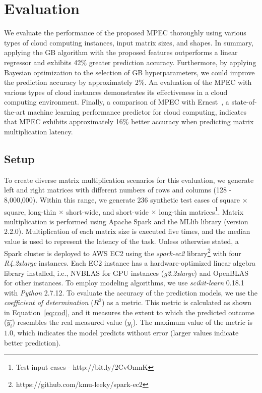 \documentclass[10pt, conference, compsocconf]{IEEEtran}
\begin{document}
\section{Evaluation}{\label{sec:eval}}
We evaluate the performance of the proposed MPEC thoroughly using various types of cloud computing instances, input matrix sizes, and shapes. In summary, applying the GB algorithm with the proposed features outperforms a linear regressor and exhibits  42\% greater prediction accuracy. Furthermore, by applying Bayesian optimization to the selection of GB hyperparameters, we could improve the prediction accuracy by approximately 2\%. An evaluation of the MPEC with various types of cloud instances demonstrates its effectiveness in a cloud computing environment. Finally, a comparison of MPEC with Ernest~\cite{ernest}, a state-of-the-art machine learning performance predictor for cloud computing, indicates that MPEC exhibits approximately 16\% better accuracy when predicting matrix multiplication latency.

\subsection{Setup}
To create diverse matrix multiplication scenarios for this evaluation, we generate left and right matrices with different numbers of rows and columns (128 - 8,000,000). Within this range, we generate 236 synthetic test cases of square $\times$ square, long-thin $\times$ short-wide, and short-wide $\times$ long-thin matrices\footnote{Test input cases - http://bit.ly/2CvOmnK}. Matrix multiplication is performed using Apache Spark and the MLlib library (version 2.2.0). Multiplication of each matrix size is executed five times, and the median value is used to represent the latency of the task. Unless otherwise stated, a Spark cluster is deployed to AWS EC2 using the \textit{spark-ec2} library\footnote{https://github.com/kmu-leeky/spark-ec2} with four \textit{R4.2xlarge} instances. Each EC2 instance has a hardware-optimized linear algebra library installed, i.e., NVBLAS for GPU instances (\textit{g2.2xlarge}) and OpenBLAS for other instances. To employ modeling algorithms, we use \textit{scikit-learn} 0.18.1 with \textit{Python} 2.7.12. To evaluate the accuracy of the prediction models, we use the \textit{coefficient of determination} ($R^2$) as a metric. This metric is calculated as shown in Equation~\ref{eq:cod}, and it measures the extent to which the predicted outcome ($\hat{y_i}$) resembles the real measured value ($y_i$). The maximum value of the metric is $1.0$, which indicates the model predicts without error (larger values indicate better prediction).
\end{document}
